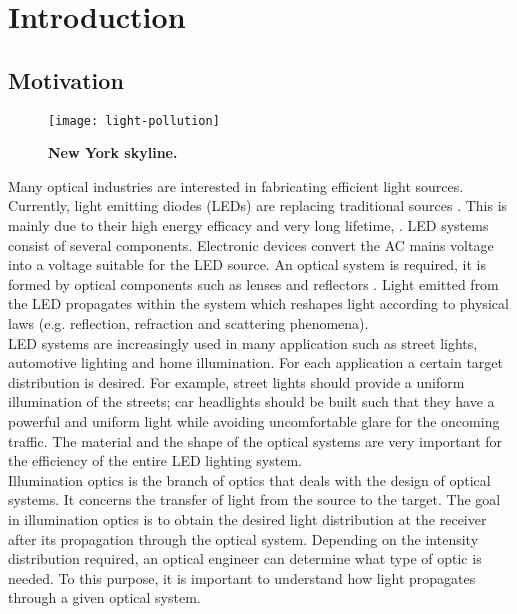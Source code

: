 \chapter{Introduction}
\section{Motivation}
\begin{figure}[t]
  \begin{minipage}[]{\textwidth}
\centering
    \texttt{[image: light-pollution]}
    \caption{\textbf{New York skyline.}}
    \label{fig:TIR_intro}
\end{minipage}
  \end{figure}
Many optical industries are interested in fabricating efficient light sources.
Currently, light emitting
diodes (LEDs) are replacing traditional sources \cite{koshel2012illumination}. 
This is mainly due to their high energy efficacy and very long lifetime, \cite{taguchi2008present, haitz2011solid}. 
LED systems consist of several components. 
Electronic devices convert the AC mains voltage into a voltage suitable for the LED source.
An optical system is required, it is formed by optical components such as lenses and reflectors \cite{moreno2008modeling}. Light emitted from the LED propagates within the system which reshapes light according to physical laws (e.g. reflection, refraction and scattering phenomena).  \\ \indent LED systems are increasingly used in many application such as street lights, automotive lighting and home illumination. For each application a certain target distribution is desired. For example, street lights should provide a uniform illumination of the streets; car headlights should be built such that they have a powerful and uniform light while avoiding uncomfortable glare for the oncoming traffic. 
The material and the shape of the optical systems are very important for the efficiency of the entire LED lighting system. \\ \indent 
Illumination optics is the branch of optics that deals with the design of optical systems. It concerns the transfer of light from the source to the target. The goal in illumination optics is to obtain the desired light distribution at the receiver after its propagation through the optical system. Depending on the intensity distribution required, an optical engineer can determine what type of optic is needed. To this purpose, it is important to understand how light propagates through a given optical system. \\ \indent
